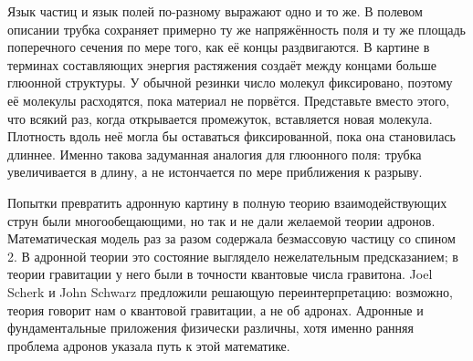 Язык частиц и язык полей по-разному выражают одно и то же. В полевом описании трубка сохраняет примерно ту же напряжённость поля и ту же площадь поперечного сечения по мере того, как её концы раздвигаются. В картине в терминах составляющих энергия растяжения создаёт между концами больше глюонной структуры. У обычной резинки число молекул фиксировано, поэтому её молекулы расходятся, пока материал не порвётся. Представьте вместо этого, что всякий раз, когда открывается промежуток, вставляется новая молекула. Плотность вдоль неё могла бы оставаться фиксированной, пока она становилась длиннее. Именно такова задуманная аналогия для глюонного поля: трубка увеличивается в длину, а не истончается по мере приближения к разрыву.

\begin{classroomqa}
\end{classroomqa}

Попытки превратить адронную картину в полную теорию взаимодействующих струн были многообещающими, но так и не дали желаемой теории адронов. Математическая модель раз за разом содержала безмассовую частицу со спином 2. В адронной теории это состояние выглядело нежелательным предсказанием; в теории гравитации у него были в точности квантовые числа гравитона. Joel Scherk и John Schwarz предложили решающую переинтерпретацию: возможно, теория говорит нам о квантовой гравитации, а не об адронах. Адронные и фундаментальные приложения физически различны, хотя именно ранняя проблема адронов указала путь к этой математике.

\begin{classroomqa}
\end{classroomqa}

